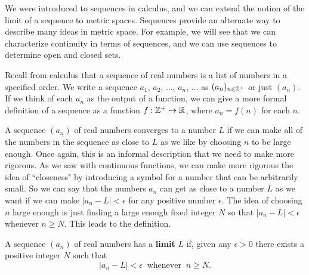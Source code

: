 \label{sec:sequences}

\vspace*{-17 pt}

\vspace*{13 pt}


We were introduced to sequences in calculus, and we can extend the notion of the limit of a sequence to metric spaces. Sequences provide an alternate way to describe many ideas in metric space. For example, we will see that we can characterize continuity in terms of sequences, and we can use sequences to determine open and closed sets. 

Recall from calculus that a sequence of real numbers is a list of numbers in a specified order. We write a sequence $a_1$, $a_2$, $\ldots$, $a_n$, $\ldots$ as $(a_n)_{n \in \mathbb{Z}^+}$ or just $(a_n)$. If we think of each $a_n$ as the output of a function, we can give a more formal definition of a sequence as a function $f: \mathbb{Z}^+ \to \mathbb{R}$, where $a_n = f(n)$ for each $n$. 

A sequence $(a_n)$ of real numbers converges to a number $L$ if we can make all of the numbers in the sequence as close to $L$ as we like by choosing $n$ to be large enough. Once again, this is an informal description that we need to make more rigorous. As we saw with continuous functions, we can make more rigorous the idea of ``closeness" by introducing a symbol for a number that can be arbitrarily small. So we can say that the numbers $a_n$ can get as close to a number $L$ as we want if we can make $| a_n - L | < \epsilon$ for any positive number $\epsilon$. The idea of choosing $n$ large enough is just finding a large enough fixed integer $N$ so that $| a_n - L | < \epsilon$ whenever $n \geq N$. This leads to the definition.

\begin{definition} \label{def:sequence_limit_real} A sequence $(a_n)$ of real numbers has a \textbf{limit} $L$ if, given any $\epsilon > 0$ there exists a positive integer $N$ such that 
\[| a_n - L | < \epsilon \ \text{ whenever } \ n \geq N.\]
\end{definition}

